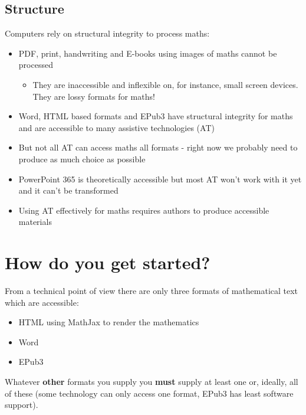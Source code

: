\documentclass[
  17pt,
  english,
  a4paper]{extarticle}
\providecommand{\tightlist}{%
  \setlength{\itemsep}{0pt}\setlength{\parskip}{0pt}}
\theoremstyle{plain}
\theoremstyle{plain}
\theoremstyle{plain}
\theoremstyle{plain}
\theoremstyle{plain}
\theoremstyle{definition}
\theoremstyle{definition}
\theoremstyle{definition}
\theoremstyle{remark}
\renewcommand{\;}{\,}
\begin{document}
\hypertarget{structure}{%
\subsection{Structure}\label{structure}}

Computers rely on structural integrity to process maths:

\begin{itemize}
\tightlist
\item
  PDF, print, handwriting and E-books using images of maths cannot be processed

  \begin{itemize}
  \tightlist
  \item
    They are inaccessible and inflexible on, for instance, small screen devices. They are lossy formats for maths!
  \end{itemize}
\item
  Word, HTML based formats and EPub3 have structural integrity for maths and are accessible to many assistive technologies (AT)
\item
  But not all AT can access maths all formats - right now we probably need to produce as much choice as possible
\item
  PowerPoint 365 is theoretically accessible but most AT won't work with it yet and it can't be transformed
\item
  Using AT effectively for maths requires authors to produce accessible materials
\end{itemize}

\hypertarget{how-do-you-get-started}{%
\section{How do you get started?}\label{how-do-you-get-started}}

From a technical point of view there are only three formats of mathematical text which are accessible:

\begin{itemize}
\tightlist
\item
  HTML using MathJax to render the mathematics
\item
  Word
\item
  EPub3
\end{itemize}

Whatever \textbf{other} formats you supply you \textbf{must} supply at least one or, ideally, all of these (some technology can only access one format, EPub3 has least software support).
\end{document}
